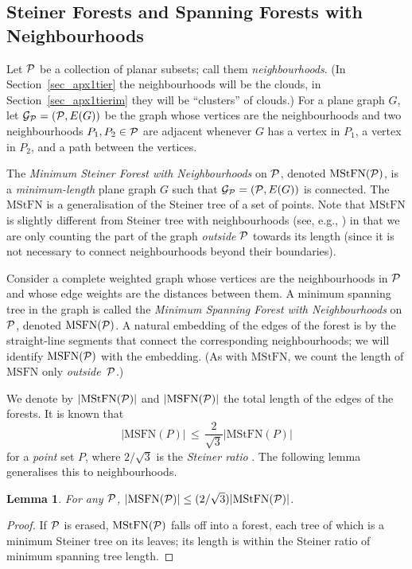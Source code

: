 \documentclass[11pt,a4paper]{article}
\newcommand{\s}[1]{{\lvert #1 \rvert}}
\newcommand{\myG}{\mathcal{G}}
\newcommand{\MSTN}{\mathrm{MSFN}}
\newcommand{\MStTN}{\mathrm{MStFN}}
\newtheorem{lemma}{Lemma}
\theoremstyle{definition}
\theoremstyle{remark}
\begin{document}
\subsection{Steiner Forests and Spanning Forests with Neighbourhoods}

Let $\mathcal{P}$ be a collection of planar subsets; call them \emph{neighbourhoods}. (In Section~\ref{sec_apx1tier} the neighbourhoods will be the clouds, in Section~\ref{sec_apx1tierim} they will be ``clusters'' of clouds.)  For a plane graph $G$, let $\myG_{\myP}=(\myP, E(G))$ be the graph whose vertices are the neighbourhoods and two neighbourhoods $P_1,P_2\in\mathcal{P}$ are adjacent whenever $G$ has a vertex in $P_1$, a vertex in $P_2$, and a path between the vertices.

The \emph{Minimum Steiner Forest with Neighbourhoods} on $\mathcal{P}$, denoted $\MStTN(\myP)$, is a \emph{minimum-length} plane graph $G$ such that $\myG_{\myP}=(\myP, E(G))$ is connected. The $\MStTN$ is a generalisation of the Steiner tree of a set of points. Note that $\MStTN$ is slightly different from Steiner tree with neighbourhoods (see, e.g., \citet{yang07minimum}) in that we are only counting the part of the graph \emph{outside} $\mathcal{P}$ towards its length (since it is not necessary to connect neighbourhoods beyond their boundaries).

Consider a complete weighted graph whose vertices are the neighbourhoods in $\mathcal{P}$ and whose edge weights are the distances between them.  A minimum spanning tree in the graph is called the \emph{Minimum Spanning Forest with Neighbourhoods} on $\mathcal{P}$, denoted $\MSTN(\myP)$.  A natural embedding of the edges of the forest is by the straight-line segments that connect the corresponding neighbourhoods; we will identify $\MSTN(\myP)$ with the embedding.  (As with $\MStTN$, we count the length of $\MSTN$ only \emph{outside}~$\mathcal{P}$.)

We denote by $\s{\MStTN(\myP)}$ and $\s{\MSTN(\myP)}$ the total length of the edges of the forests.  It is known that
\[
    \s{\MSTN({P})} \,\le\, \frac{2}{\sqrt{3}} \s{\MStTN({P})}
\]
for a \emph{point} set $P$, where $2/\sqrt{3}$ is the \emph{Steiner ratio} \cite{du90approach}. The following lemma generalises this to neighbourhoods.
\begin{lemma}\label{lem_StRatio}
    For any\/ $\mathcal{P}$, $\s{\MSTN(\myP)} \le (2/\sqrt{3}) \s{\MStTN(\myP)}$.
\end{lemma}
\begin{proof}
    If $\mathcal{P}$ is erased, $\MStTN(\myP)$ falls off into a forest, each tree of which is a minimum Steiner tree on its leaves; its length is within the Steiner ratio of minimum spanning tree length.
\end{proof}
\end{document}
